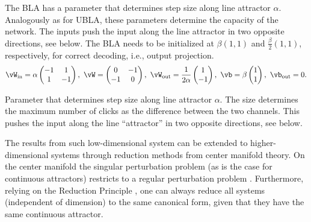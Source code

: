 \documentclass{article} %
\newcounter{ct}
\newcommand{\win}{\vW_{\text{in}}}
\newcommand{\wout}{\vW_{\text{out}}}
\newcommand{\bout}{\vb_{\text{out}}}
\theoremstyle{definition}
\theoremstyle{remark}
\begin{document}
The BLA has a parameter that determines step size along line attractor \(\alpha\). Analogously as for UBLA, these parameters determine the capacity of the network.
The inputs push the input along the line attractor in two opposite directions, see below. The BLA needs to be initialized at \(\beta(1,1)\) and \(\tfrac{\beta}{2}(1,1)\), respectively, for correct decoding, i.e., output projection.
\begin{equation}\label{eq:bla}
\win = \alpha
\begin{pmatrix}
-1  &  1 \\
1  &  -1
\end{pmatrix}, \
\vW =
\begin{pmatrix}
0  &  -1 \\
-1  &  0
\end{pmatrix}, \
\wout = \frac{1}{2\alpha}
\begin{pmatrix}
1  \\  -1
\end{pmatrix}, \
\vb = \beta
\begin{pmatrix}
1 \\  1
\end{pmatrix}, \
\bout = 0.
\end{equation}


Parameter that determines step size along line attractor \(\alpha\).
The size determines the maximum number of clicks as the difference between the two channels.
This pushes the input along the line ``attractor'' in two opposite directions, %
see below.


The results from such low-dimensional system can be extended to higher-dimensional systems through reduction methods from center manifold theory.
On the center manifold the singular perturbation problem (as is the case for continuous attractors) restricts to a regular perturbation problem \citep{fenichel1979geometric}. Furthermore, relying on the Reduction Principle \citep{kirchgraber1990geometry}, one can always reduce all systems (independent of dimension) to the same canonical form, given that they have the same continuous attractor.
\end{document}
